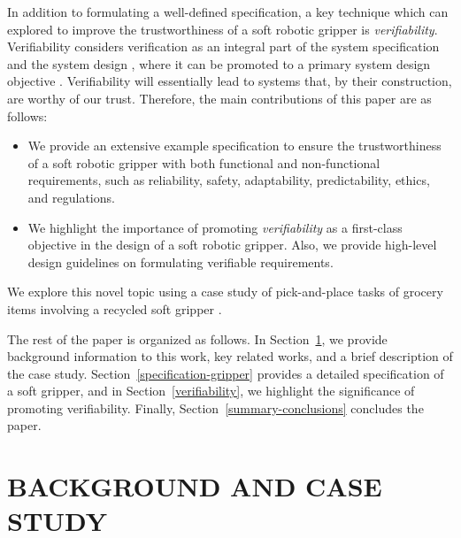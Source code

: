 \documentclass[letterpaper, 10 pt, conference]{ieeeconf}  %
\begin{document}
	In addition to formulating a well-defined specification, a key technique which can explored to improve the trustworthiness of a soft robotic gripper is \emph{verifiability}. %
	Verifiability considers verification as an integral part of the system specification and the system design \cite{Mousavi2022}, where it can be promoted to a primary system design objective \cite{Eder2021}. 
	Verifiability will essentially lead to systems that, by their construction, are worthy of our trust. 
	Therefore, the main contributions of this paper are as follows:
	\begin{itemize}
		\item We provide an extensive example specification to ensure the trustworthiness of a soft robotic gripper \cite{Partridge2022} with both functional and non-functional requirements, such as reliability, safety, adaptability, predictability, ethics, and regulations.
		\item We highlight the importance of promoting \emph{verifiability} as a first-class objective in the design of a soft robotic gripper. Also, we provide high-level design guidelines on formulating verifiable requirements. 
	\end{itemize}
	We explore this novel topic using a case study of pick-and-place tasks of grocery items \cite{Triantafyllou2019, Sotiropoulos2018} involving a recycled soft gripper \cite{Partridge2022}. 
	
	The rest of the paper is organized as follows. 
	In Section~\ref{background-relatedwork}, we provide background information to this work, key related works, and a brief description of the case study. %
	Section~\ref{specification-gripper} provides a detailed specification of a soft gripper, and in Section~\ref{verifiability}, we highlight the significance of promoting verifiability.
	Finally, Section~\ref{summary-conclusions} concludes the paper. 	
	
	\section{BACKGROUND AND CASE STUDY}\label{background-relatedwork}
	
\end{document}
